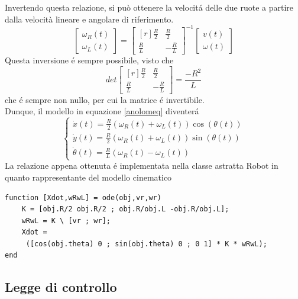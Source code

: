 \documentclass[14pt,a4paper]{extarticle}
\begin{document}
Invertendo questa relazione, si può ottenere la velocitá delle due ruote a partire dalla velocità lineare e angolare di riferimento.
\begin{equation}
\label{wrwl}
\begin{bmatrix}
\omega_R(t) \\
\omega_L(t)
\end{bmatrix}
=
\begin{bmatrix*}[r]
\frac{R}{2} & \frac{R}{2} \\
\frac{R}{L} & -\frac{R}{L}
\end{bmatrix*}^{-1}
\begin{bmatrix}
v(t) \\
\omega(t)
\end{bmatrix}
\end{equation}
Questa inversione é sempre possibile, visto che
\[det\begin{bmatrix*}[r]
\frac{R}{2} & \frac{R}{2} \\
\frac{R}{L} & -\frac{R}{L}
\end{bmatrix*} = \frac{-R^2}{L}\] che é sempre non nullo, per cui la matrice é invertibile.\\
Dunque, il modello in equazione \ref{anolomeq} diventerá
\[
\begin{cases}
\dot{x}(t) = \frac{R}{2} \left( \omega_R(t)+\omega_L(t) \right) \cos(\theta(t)) \\
\dot{y}(t) = \frac{R}{2} \left( \omega_R(t)+\omega_L(t) \right)\sin(\theta(t)) \\
\dot{\theta}(t) = \frac{R}{L} \left( \omega_R(t)-\omega_L(t) \right)
\end{cases}
\]
La relazione appena ottenuta é implementata nella classe astratta Robot in quanto rappresentante del modello cinematico
\begin{lstlisting}[caption=Metodo che esprime lo specifico modello cinematico]
function [Xdot,wRwL] = ode(obj,vr,wr)
	K = [obj.R/2 obj.R/2 ; obj.R/obj.L -obj.R/obj.L];
	wRwL = K \ [vr ; wr];
	Xdot = 
	 ([cos(obj.theta) 0 ; sin(obj.theta) 0 ; 0 1] * K * wRwL);
end
\end{lstlisting}

\subsection{Legge di controllo}
\end{document}
